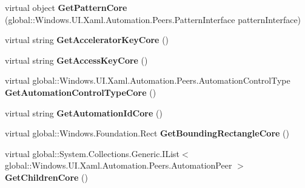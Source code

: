 \begin{DoxyCompactItemize}
\mbox{\label{class_windows_1_1_u_i_1_1_xaml_1_1_automation_1_1_peers_1_1_automation_peer_aa044472b4231fb26f5f1f9c526533020}} 
virtual object {\bfseries Get\+Pattern\+Core} (global\+::\+Windows.\+U\+I.\+Xaml.\+Automation.\+Peers.\+Pattern\+Interface pattern\+Interface)
\item 
\mbox{\label{class_windows_1_1_u_i_1_1_xaml_1_1_automation_1_1_peers_1_1_automation_peer_a9781a8d9c5fdebc0deb28ddc4586e09a}} 
virtual string {\bfseries Get\+Accelerator\+Key\+Core} ()
\item 
\mbox{\label{class_windows_1_1_u_i_1_1_xaml_1_1_automation_1_1_peers_1_1_automation_peer_a3d4baa373625c8c650d5f410d99b44ba}} 
virtual string {\bfseries Get\+Access\+Key\+Core} ()
\item 
\mbox{\label{class_windows_1_1_u_i_1_1_xaml_1_1_automation_1_1_peers_1_1_automation_peer_af2422569cceaff985ea73cae254225e7}} 
virtual global\+::\+Windows.\+U\+I.\+Xaml.\+Automation.\+Peers.\+Automation\+Control\+Type {\bfseries Get\+Automation\+Control\+Type\+Core} ()
\item 
\mbox{\label{class_windows_1_1_u_i_1_1_xaml_1_1_automation_1_1_peers_1_1_automation_peer_a014ee70abfd483498acd60d958afc21e}} 
virtual string {\bfseries Get\+Automation\+Id\+Core} ()
\item 
\mbox{\label{class_windows_1_1_u_i_1_1_xaml_1_1_automation_1_1_peers_1_1_automation_peer_a3c155bdaac9b35e1c7bb423d47fd707d}} 
virtual global\+::\+Windows.\+Foundation.\+Rect {\bfseries Get\+Bounding\+Rectangle\+Core} ()
\item 
\mbox{\label{class_windows_1_1_u_i_1_1_xaml_1_1_automation_1_1_peers_1_1_automation_peer_a09114f6788a9e206e93a6ffbd12620bf}} 
virtual global\+::\+System.\+Collections.\+Generic.\+I\+List$<$ global\+::\+Windows.\+U\+I.\+Xaml.\+Automation.\+Peers.\+Automation\+Peer $>$ {\bfseries Get\+Children\+Core} ()

\end{DoxyCompactItemize}
